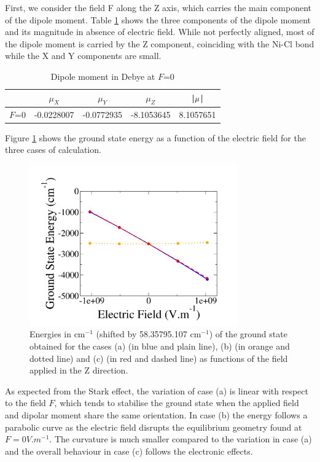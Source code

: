 \documentclass[10pt]{report}
\numberwithin{equation}{section}
\begin{document}
First, we consider the field F along the Z axis, which carries the main component of the dipole moment.
Table \ref{tab:DipF0Z} shows the three components of the dipole moment and its magnitude in absence of electric field.
While not perfectly aligned, most of the dipole moment is carried by the Z component, coinciding with the Ni-Cl bond while the X and Y components are small.

\begin{table}[h]
    \centering
    \begin{tabular}{|c | c c c | c|}
        \hline
        & $\mu_X$ & $\mu_Y$ & $\mu_Z$ & |$\vb \mu$|\\
        \hline
        $F$=0 & -0.0228007 & -0.0772935 & -8.1053645 & 8.1057651   \\
        \hline
    \end{tabular}
    \caption{Dipole moment in Debye at $F$=0}
    \label{tab:DipF0Z}
\end{table}

Figure \ref{GSE_Z} shows the ground state energy as a function of the electric field for the three cases of calculation.

\begin{figure}[!ht]
    \centering
    \includegraphics[width=0.8\textwidth]{Images/E_Z_grand.png}
    \caption{Energies in cm$^{-1}$ (shifted by 58.35795.107 cm$^{-1}$) of the ground state obtained for the cases (a) (in blue and plain line), (b)
    (in orange and dotted line) and (c) (in red and dashed line) as functions of the field applied in the Z direction.}
    \label{GSE_Z}
\end{figure}
As expected from the Stark effect, the variation of case (a) is linear with respect to the field $F$, which tends to stabilise the ground state when the applied field and dipolar moment share the same orientation.
In case (b) the energy follows a parabolic curve as the electric field disrupts the equilibrium geometry found at $F=0V.m^{-1}$. 
The curvature is much smaller compared to the variation in case (a) and the overall behaviour in case (c) follows the electronic effects.
\end{document}
